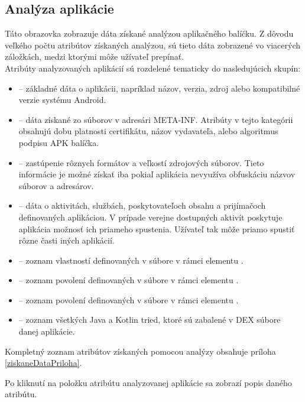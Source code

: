 \subsection{Analýza aplikácie}
Táto obrazovka zobrazuje dáta získané analýzou aplikačného balíčku. Z dôvodu veľkého počtu atribútov získaných analýzou, sú tieto dáta zobrazené vo viacerých záložkách, medzi ktorými môže užívateľ prepínať. 
\\
\noindent Atribúty analyzovaných aplikácií sú rozdelené tematicky do nasledujúcich skupín:
\begin{itemize}
	\item {} -- základné dáta o aplikácii, napríklad názov, verzia, zdroj alebo kompatibilné verzie systému Android.
	\item {} -- dáta získané zo súborov v adresári META-INF. Atribúty v tejto kategórii obsahujú dobu platnosti certifikátu, názov vydavateľa, alebo algoritmus podpisu APK balíčka.
	\item {} -- zastúpenie rôznych formátov a veľkostí zdrojových súborov. Tieto informácie je možné získať iba pokiaľ aplikácia nevyužíva obfuskáciu názvov súborov a adresárov.
	\item {} -- dáta o aktivitách, službách, poskytovateľoch obsahu a prijímačoch definovaných aplikáciou. V prípade verejne dostupných aktivít poskytuje aplikácia možnosť ich priameho spustenia. Užívateľ tak môže priamo spustiť rôzne časti iných aplikácií.
	\item {} -- zoznam vlastností definovaných v súbore  v rámci elementu .
	\item {} -- zoznam povolení definovaných v súbore  v rámci elementu .
	\item {} -- zoznam povolení definovaných v súbore  v rámci elementu 
.
	\item {} -- zoznam všetkých Java a Kotlin tried, ktoré sú zabalené v DEX súbore danej aplikácie.
\end{itemize}
Kompletný zoznam atribútov získaných pomocou analýzy obsahuje príloha \ref{ziskaneDataPriloha}. 

Po kliknutí na položku atribútu analyzovanej aplikácie sa zobrazí popis daného atribútu.

